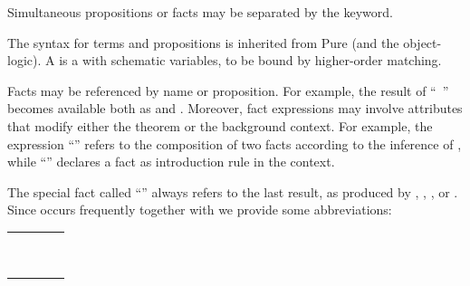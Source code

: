 \begin{isabellebody}
\begin{isamarkuptext}
  \medskip Simultaneous propositions or facts may be separated by the
  \hyperlink{keyword.and}{\mbox{}} keyword.

  \medskip The syntax for terms and propositions is inherited from
  Pure (and the object-logic).  A  is a  with schematic variables, to be bound by higher-order
  matching.

  \medskip Facts may be referenced by name or proposition.  For
  example, the result of ``\hyperlink{command.have}{\mbox{}}~''
  becomes available both as  and
  \isacharbackquoteopen{}\isacharbackquoteclose.  Moreover,
  fact expressions may involve attributes that modify either the
  theorem or the background context.  For example, the expression
  ``'' refers to the composition of two facts
  according to the \hyperlink{inference.resolution}{\mbox{}} inference of
  , while ``''
  declares a fact as introduction rule in the context.

  The special fact called ``\hyperlink{fact.this}{\mbox{}}'' always refers to the last
  result, as produced by \hyperlink{command.note}{\mbox{}}, \hyperlink{command.assume}{\mbox{}}, \hyperlink{command.have}{\mbox{}}, or \hyperlink{command.show}{\mbox{}}.  Since \hyperlink{command.note}{\mbox{}} occurs
  frequently together with \hyperlink{command.then}{\mbox{}} we provide some
  abbreviations:

  \medskip
  \begin{tabular}{rcl}
    \hyperlink{command.from}{\mbox{\isa{\isacommand{from}}}}~\isa{a} & \isa{{\isachardoublequote}{\isasymequiv}{\isachardoublequote}} & \hyperlink{command.note}{\mbox{\isa{\isacommand{note}}}}~\isa{a}~\hyperlink{command.then}{\mbox{\isa{\isacommand{then}}}} \\
    \hyperlink{command.with}{\mbox{\isa{\isacommand{with}}}}~\isa{a} & \isa{{\isachardoublequote}{\isasymequiv}{\isachardoublequote}} & \hyperlink{command.from}{\mbox{\isa{\isacommand{from}}}}~\isa{{\isachardoublequote}a\ {\isasymAND}\ this{\isachardoublequote}} \\
  \end{tabular}
  \medskip


\end{isamarkuptext}
\end{isabellebody}
